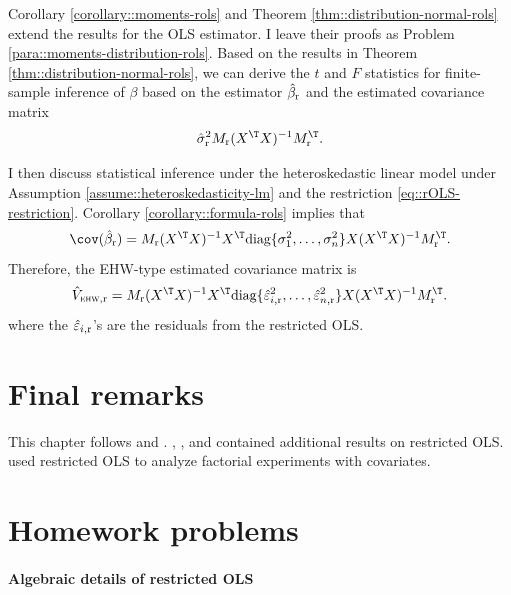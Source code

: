 Corollary \ref{corollary::moments-rols} and Theorem \ref{thm::distribution-normal-rols} extend the results for the OLS estimator. I leave their proofs as Problem  \ref{para::moments-distribution-rols}. 
Based on the results in Theorem \ref{thm::distribution-normal-rols}, we can derive the $t$ and $F$ statistics for finite-sample inference of $\beta$ based on the estimator $\hat{\beta}_\textup{r} $ and the estimated covariance matrix
$$
\hat{\sigma}^2_\textup{r}  M_\textup{r} (X^{\T}X)^{-1} M_\textup{r}^{\T} . 
$$



 





 I then discuss statistical inference under the heteroskedastic linear model under Assumption \ref{assume::heteroskedasticity-lm} and the restriction \eqref{eq::rOLS-restriction}. Corollary \ref{corollary::formula-rols} implies that
 $$
 \cov(  \hat{\beta}_\textup{r}   )
=
 M_\textup{r} (X^{\T}X)^{-1}  X^{\T} \text{diag}\{\sigma_1^2, \ldots, \sigma_n^2 \}  X     (X^{\T}X)^{-1} M_\textup{r}^{\T}.
 $$
 Therefore, the EHW-type estimated covariance matrix is
 $$
 \hat{V}_{\textsc{ehw}, \textup{r}}
=
M_\textup{r} (X^{\T}X)^{-1}  
X^{\T} \text{diag}\{   \hat{\varepsilon}_{i, \textup{r}}^2 , \ldots, \hat{\varepsilon}_{n, \textup{r}}^2 \}  X    
 (X^{\T}X)^{-1} M_\textup{r}^{\T}.
 $$ 
 where the $\hat{\varepsilon}_{i, \textup{r}}$'s are the residuals from the restricted OLS. 


 


\section{Final remarks}


This chapter follows \citet{theil} and \cite{rao}. \citet{bock1973statistical}, \citet{judge1974post}, and \citet{tarpey2000note} contained additional results on restricted OLS. 
\citet{zhao2023covariate} used restricted OLS to analyze factorial experiments with covariates. 




\section{Homework problems}

\paragraph{Algebraic details of restricted OLS}
\label{para::algebra-rols}

